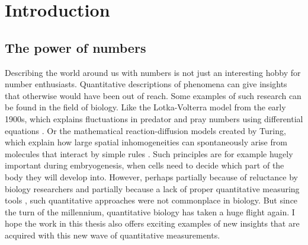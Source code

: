 \chapter{Introduction}
\label{chapter:introduction}







\section{The power of numbers}

%
Describing the world around us with numbers is not just an interesting hobby for number enthusiasts.
%
Quantitative descriptions of phenomena can give insights that otherwise would have been out of reach.
%
%
%
Some examples of such research can be found in the field of biology. 
%
Like the Lotka-Volterra model from the early 1900s, which explains fluctuations in predator and pray numbers using differential equations \cite{Lotka1920,Volterra1928}.
Or the mathematical reaction-diffusion models created by Turing, which explain how large spatial inhomogeneities can spontaneously arise from molecules 
that interact by simple rules \cite{Turing1952}.
Such principles are for example hugely important during embryogenesis, when cells need to decide which part of the body they will develop into.
%
However, perhaps partially because of reluctance by biology researchers \cite{Lazebnik2003} and partially because a lack of proper quantitative measuring tools \cite{Kitano2002, Wollman2018}, such quantitative approaches %
were not commonplace in biology.
%
But since the turn of the millennium, 
quantitative biology has taken a huge flight again.
%
I hope the work in this thesis also offers exciting examples of new insights that are acquired with this new wave of quantitative measurements.

